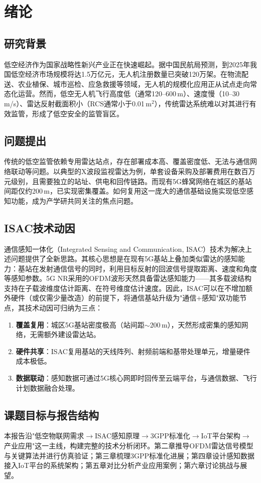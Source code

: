\section{绪论}

\subsection{研究背景}
低空经济作为国家战略性新兴产业正在快速崛起。据中国民航局预测，到2025年我国低空经济市场规模将达1.5万亿元，无人机注册数量已突破120万架。在物流配送、农业植保、城市巡检、应急救援等领域，无人机的规模化应用正从试点走向常态化运营。然而，低空无人机飞行高度低（通常120--600\,m）、速度慢（10--30\,m/s）、雷达反射截面积小（RCS通常小于0.01\,m$^2$），传统雷达系统难以对其进行有效监管，形成了低空安全的监管盲区。

\subsection{问题提出}
传统的低空监管依赖专用雷达站点，存在部署成本高、覆盖密度低、无法与通信网络联动等问题。以典型的X波段监视雷达为例，单套设备采购及部署费用在数百万元级别，且需要独立的站址、供电和回传链路。而现有5G蜂窝网络在城区的基站间距仅约200\,m，已实现密集覆盖。如何复用这一庞大的通信基础设施实现低空感知功能，成为产学研共同关注的焦点问题。

\subsection{ISAC技术动因}
通信感知一体化（Integrated Sensing and Communication, ISAC）技术为解决上述问题提供了全新思路。其核心思想是在现有5G基站上叠加类似雷达的感知能力：基站在发射通信信号的同时，利用目标反射的回波信号提取距离、速度和角度等感知参数。5G NR采用的OFDM波形天然具备雷达感知能力——其多载波结构支持在子载波维度估计距离、在符号维度估计速度。因此，ISAC可以在不增加额外硬件（或仅需少量改造）的前提下，将通信基站升级为"通信+感知"双功能节点，其技术动因可归纳为三点：

\begin{enumerate}[label=(\arabic*)]
  \item \textbf{覆盖复用}：城区5G基站密度极高（站间距$\sim$200\,m），天然形成密集的感知网络，无需额外建设雷达站。
  \item \textbf{硬件共享}：ISAC复用基站的天线阵列、射频前端和基带处理单元，增量硬件成本极低。
  \item \textbf{数据联动}：感知数据可通过5G核心网即时回传至云端平台，与通信数据、飞行计划数据融合处理。
\end{enumerate}

\subsection{课题目标与报告结构}
本报告沿"低空物联网需求$\to$ISAC感知原理$\to$3GPP标准化$\to$IoT平台架构$\to$产业应用"这一主线，构建完整的技术分析闭环。第二章推导OFDM雷达信号模型与关键算法并进行仿真验证；第三章梳理3GPP标准化进展；第四章设计感知数据接入IoT平台的系统架构；第五章对比分析产业应用案例；第六章讨论挑战与展望。

